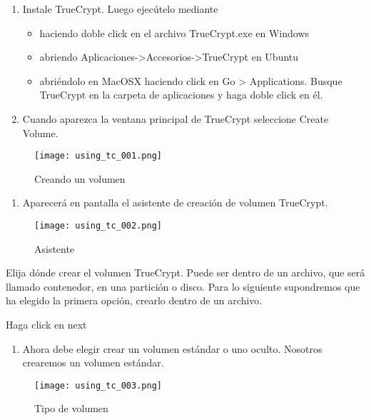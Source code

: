 \documentclass[10pt,a5paper,twoside,,]{book}
\providecommand{\tightlist}{%
  \setlength{\itemsep}{0pt}\setlength{\parskip}{0pt}}
\begin{document}
\begin{enumerate}
\def\labelenumi{\arabic{enumi}.}
\item
  Instale TrueCrypt. Luego ejecútelo mediante

  \begin{itemize}
  \tightlist
  \item
    haciendo doble click en el archivo TrueCrypt.exe en Windows
  \item
    abriendo
    Aplicaciones-\textgreater{}Accesorios-\textgreater{}TrueCrypt en
    Ubuntu
  \item
    abriéndolo en MacOSX haciendo click en Go \textgreater{}
    Applications. Busque TrueCrypt en la carpeta de aplicaciones y haga
    doble click en él.
  \end{itemize}
\item
  Cuando aparezca la ventana principal de TrueCrypt seleccione Create
  Volume.
\end{enumerate}

\begin{figure}[htbp]
\centering
\texttt{[image: using\_tc\_001.png]}
\caption{Creando un volumen}
\end{figure}

\begin{enumerate}
\def\labelenumi{\arabic{enumi}.}
\setcounter{enumi}{2}
\tightlist
\item
  Aparecerá en pantalla el asistente de creación de volumen TrueCrypt.
\end{enumerate}

\begin{figure}[htbp]
\centering
\texttt{[image: using\_tc\_002.png]}
\caption{Asistente}
\end{figure}

Elija dónde crear el volumen TrueCrypt. Puede ser dentro de un archivo,
que será llamado contenedor, en una partición o disco. Para lo siguiente
supondremos que ha elegido la primera opción, crearlo dentro de un
archivo.

Haga click en next

\begin{enumerate}
\def\labelenumi{\arabic{enumi}.}
\setcounter{enumi}{3}
\tightlist
\item
  Ahora debe elegir crear un volumen estándar o uno oculto. Nosotros
  crearemos un volumen estándar.
\end{enumerate}

\begin{figure}[htbp]
\centering
\texttt{[image: using\_tc\_003.png]}
\caption{Tipo de volumen}
\end{figure}
\end{document}
